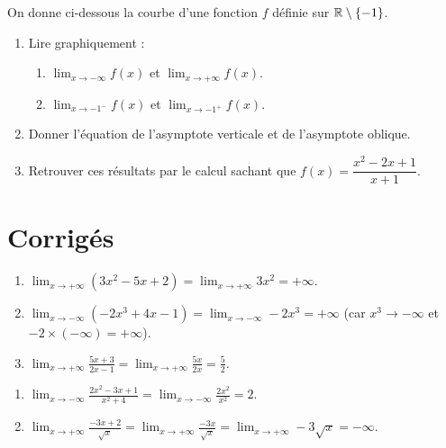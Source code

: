 On donne ci-dessous la courbe d'une fonction $f$ définie sur $\mathbb{R}\setminus\{-1\}$.
\begin{illus}
\end{illus}
\begin{enumerate}[label=\arabic*)]
\item Lire graphiquement :
\begin{enumerate}[label=\alph*)]
\item $\displaystyle\lim_{x\to -\infty} f(x)$ et $\displaystyle\lim_{x\to +\infty} f(x)$.
\item $\displaystyle\lim_{x\to -1^-} f(x)$ et $\displaystyle\lim_{x\to -1^+} f(x)$.
\end{enumerate}
\item Donner l'équation de l'asymptote verticale et de l'asymptote oblique.
\item Retrouver ces résultats par le calcul sachant que $f(x)=\dfrac{x^2-2x+1}{x+1}$.
\end{enumerate}

\section{Corrigés}

\begin{enumerate}[label=\alph*)]
\item $\displaystyle\lim_{x\to +\infty} (3x^2-5x+2)=\lim_{x\to +\infty} 3x^2=+\infty$.
\item $\displaystyle\lim_{x\to -\infty} (-2x^3+4x-1)=\lim_{x\to -\infty} -2x^3=+\infty$ (car $x^3\to -\infty$ et $-2\times(-\infty)=+\infty$).
\item $\displaystyle\lim_{x\to +\infty} \frac{5x+3}{2x-1}=\lim_{x\to +\infty} \frac{5x}{2x}=\frac{5}{2}$.
\end{enumerate}

\begin{enumerate}[label=\alph*)]
\item $\displaystyle\lim_{x\to -\infty} \frac{2x^2-3x+1}{x^2+4}=\lim_{x\to -\infty} \frac{2x^2}{x^2}=2$.
\item $\displaystyle\lim_{x\to +\infty} \frac{-3x+2}{\sqrt{x}}=\lim_{x\to +\infty} \frac{-3x}{\sqrt{x}}=\lim_{x\to +\infty} -3\sqrt{x}=-\infty$.
\end{enumerate}

